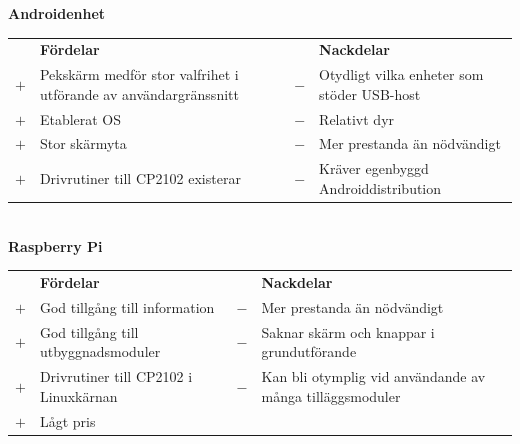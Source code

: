 \documentclass{article}
\begin{document}
            \noindent\textsf{\textbf{Androidenhet}}\\
            \begin{tabularx}{\textwidth}{@{}cXcX}
                & \textbf{Fördelar}     & & \textbf{Nackdelar} \\
                $+$ & Pekskärm medför stor valfrihet i utförande av användargränssnitt     &                            $-$ & Otydligt vilka enheter som
                                                  stöder USB-host \\
                $+$ &  Etablerat OS     &   $-$ & Relativt dyr \\
                $+$ &  Stor skärmyta    &   $-$ & Mer prestanda än nödvändigt \\
                $+$ &  Drivrutiner till CP2102 existerar &
                                            $-$ & Kräver egenbyggd Androiddistribution \\
            \end{tabularx}\\

                
            \noindent\textsf{\textbf{Raspberry Pi}}\\
            \begin{tabularx}{\textwidth}{@{}cXcX}
                & \textbf{Fördelar}     & & \textbf{Nackdelar} \\
                $+$ & God tillgång till information & 
                                        $-$ & Mer prestanda än nödvändigt \\
                $+$ & God tillgång till utbyggnads\-moduler & 
                                        $-$ & Saknar skärm och knappar i 
                                              grundutförande \\
                $+$ & Drivrutiner till CP2102 i Linuxkärnan &
                                        $-$ & Kan bli otymplig vid användande av   
                                              många tilläggsmoduler \\   
                $+$ & Lågt pris \\   
            \end{tabularx}\\
            
\end{document}
